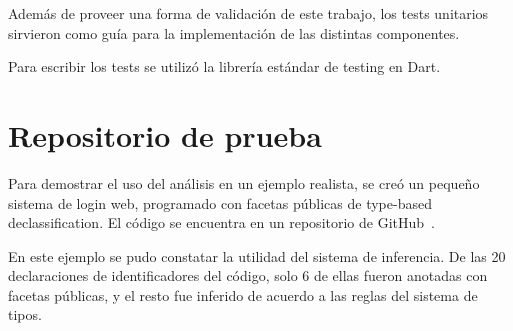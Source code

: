 Además de proveer una forma de validación de este trabajo, los tests unitarios sirvieron como guía para la implementación de las distintas componentes.

Para escribir los tests se utilizó la librería estándar de testing en Dart.

\section{Repositorio de prueba}
Para demostrar el uso del análisis en un ejemplo realista, se creó un pequeño sistema de login web, programado con facetas públicas de type-based declassification. El código se encuentra en un repositorio de GitHub~\cite{repotest}.

En este ejemplo se pudo constatar la utilidad del sistema de inferencia. De las 20 declaraciones de identificadores del código, solo 6 de ellas fueron anotadas con facetas públicas, y el resto fue inferido de acuerdo a las reglas del sistema de tipos.
